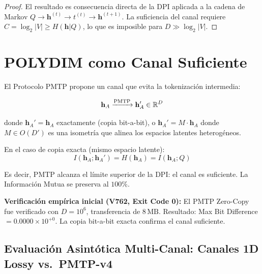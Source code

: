 \begin{proof}
El resultado es consecuencia directa de la DPI aplicada a la cadena de Markov
$Q \to \mathbf{h}^{(t)} \to t^{(t)} \to \mathbf{h}^{(t+1)}$. La suficiencia
del canal requiere $C = \log_2|V| \ge H(\mathbf{h}|Q)$, lo que es imposible
para $D \gg \log_2|V|$.
\end{proof}

\section{POLYDIM como Canal Suficiente}

El Protocolo PMTP propone un canal que evita la tokenización intermedia:

\begin{equation}
\mathbf{h}_A \xrightarrow{\text{PMTP}} \mathbf{h}_A' \in \mathbb{R}^{D}
\end{equation}

donde $\mathbf{h}_A' = \mathbf{h}_A$ exactamente (copia bit-a-bit), o
$\mathbf{h}_A' = M \cdot \mathbf{h}_A$ donde $M \in O(D')$ es una isometría
que alinea los espacios latentes heterogéneos.

En el caso de copia exacta (mismo espacio latente):
\begin{equation}
I(\mathbf{h}_A; \mathbf{h}_A') = H(\mathbf{h}_A) = I(\mathbf{h}_A; Q)
\end{equation}

Es decir, PMTP alcanza el límite superior de la DPI: el canal es suficiente.
La Información Mutua se preserva al $100\%$.

\begin{certifiedbox}
\textbf{Verificación empírica inicial (V762, Exit Code 0):}
El PMTP Zero-Copy fue verificado con $D = 10^6$, transferencia de $8\,\text{MB}$.
Resultado: Max Bit Difference $= 0.0000 \times 10^{+0}$.
La copia bit-a-bit exacta confirma el canal suficiente.
\end{certifiedbox}

\subsection{Evaluación Asintótica Multi-Canal: Canales 1D Lossy vs.\ PMTP-v4}
\label{subsec:eval_dpi_multicanal}

